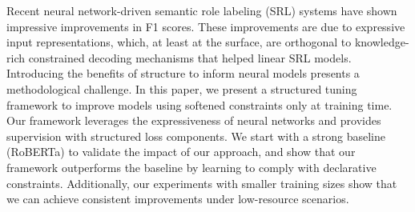 Recent neural network-driven semantic role labeling (SRL) systems have shown impressive improvements in F1 scores. These improvements are due to expressive input representations, which, at least at the surface, are orthogonal to knowledge-rich constrained decoding mechanisms that helped linear SRL models. Introducing the benefits of structure to inform neural models presents a methodological challenge. In this paper, we present a structured tuning framework to improve models using softened constraints only at training time. Our framework leverages the expressiveness of neural networks and provides supervision with structured loss components. We start with a strong baseline (RoBERTa) to validate the impact of our approach, and show that our framework outperforms the baseline by learning to comply with declarative constraints. Additionally, our experiments with smaller training sizes show that we can achieve consistent improvements under low-resource scenarios.
